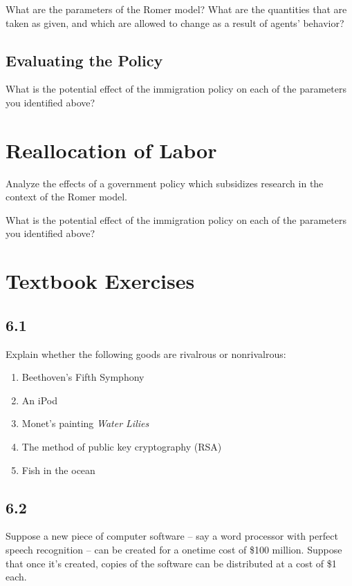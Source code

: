 \documentclass{article}
\begin{document}
What are the parameters of the Romer model? What are the quantities that are taken as given, and which are allowed to change as a result of agents' behavior?

\subsection*{Evaluating the Policy}

What is the potential effect of the immigration policy on each of the parameters you identified above?

\section{Reallocation of Labor}

Analyze the effects of a government policy which subsidizes research in the context of the Romer model.

What is the potential effect of the immigration policy on each of the parameters you identified above?

\section{Textbook Exercises}

\subsection*{6.1}

Explain whether the following goods are rivalrous or nonrivalrous:

\begin{enumerate}
\item Beethoven's Fifth Symphony
\item An iPod
\item Monet's painting \textit{Water Lilies}
\item The method of public key cryptography (RSA)
\item Fish in the ocean
\end{enumerate}

\subsection*{6.2}

Suppose a new piece of computer software -- say a word processor with perfect speech recognition -- can be created for a onetime cost of \$100 million. Suppose that once it's created, copies of the software can be distributed at a cost of \$1 each.
\end{document}
